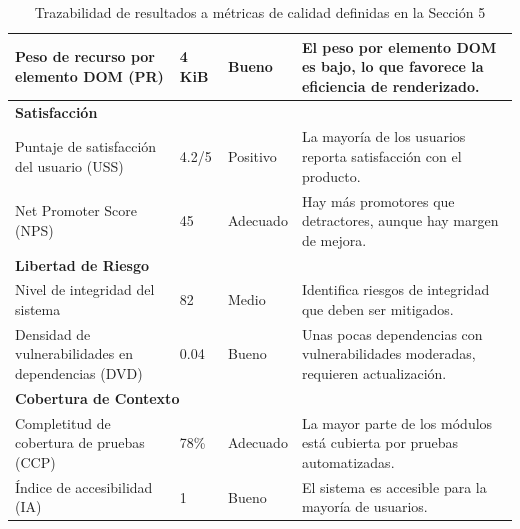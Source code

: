 \begin{table}[H]
\begin{tabular}{|p{4cm}|p{3cm}|p{3cm}|p{5cm}|}
        \hline
        Peso de recurso por elemento DOM (PR)              & 4 KiB                   & Bueno           & El peso por elemento DOM es bajo, lo que favorece la eficiencia de renderizado. \\
        \hline
        \multicolumn{4}{|l|}{\textbf{Satisfacción}}                                                                                                                                      \\
        \hline
        Puntaje de satisfacción del usuario (USS)          & 4.2/5                   & Positivo        & La mayoría de los usuarios reporta satisfacción con el producto.                \\
        \hline
        Net Promoter Score (NPS)                           & 45                      & Adecuado        & Hay más promotores que detractores, aunque hay margen de mejora.                \\
        \hline
        \multicolumn{4}{|l|}{\textbf{Libertad de Riesgo}}                                                                                                                                \\
        \hline
        Nivel de integridad del sistema                    & 82                      & Medio           & Identifica riesgos de integridad que deben ser mitigados.                       \\
        \hline
        Densidad de vulnerabilidades en dependencias (DVD) & 0.04                    & Bueno            & Unas pocas dependencias con vulnerabilidades moderadas, requieren actualización.           \\
        \hline
        \multicolumn{4}{|l|}{\textbf{Cobertura de Contexto}}                                                                                                                             \\
        \hline
        Completitud de cobertura de pruebas (CCP)          & 78\%                    & Adecuado        & La mayor parte de los módulos está cubierta por pruebas automatizadas.          \\
        \hline
        Índice de accesibilidad (IA)                       & 1                       & Bueno           & El sistema es accesible para la mayoría de usuarios.                            \\
        \hline
    \end{tabular}
    \caption{Trazabilidad de resultados a métricas de calidad definidas en la Sección 5}
    \label{tab:trazabilidad_metricas}
\end{table}

